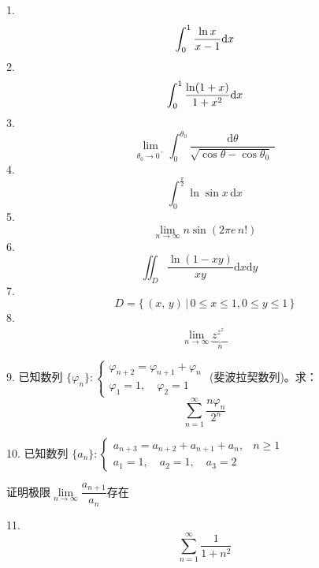 \documentclass{article}
\begin{document}
1.
$$\int_0^1 \frac{\ln x}{x-1} {\rm d}x$$
2.
$$\int_0^1 \frac{\ln (1+x)}{1+x^2} {\rm d}x$$
3.
$$\lim_{\theta_0 \rightarrow 0^{\,^+}} \int_{0}^{\theta_0} \frac{\mathrm{d}\theta}{\sqrt{\cos{\theta}-\cos{\theta_0}}\;}$$
4.
$$\int_0^{\frac{\pi}{2}} \ln{\sin{x}}\,\mathrm{d}x$$
5.
$$\lim_{n \rightarrow \infty}  n \sin{(2\pi e \, n!)}$$
6.
$$\iint_D \frac{\ln {(1-x y)}}{x y}  \mathrm{d}x\mathrm{d}y \quad$$
7.
$$D = \{\,(x, \, y) \, | \, 0 \leqslant x \leqslant 1, 0 \leqslant y \leqslant 1 \, \}$$
8.
$$\lim_{n \to \infty} \underbrace{z^{z^{z^{.^{ .^{.^z} }}}}}_n$$

9.
已知数列 
$\{\varphi_n\}:
\begin{cases}
\varphi_{n+2} = \varphi_{n+1} + \varphi_n\\
\varphi_1=1, \quad \varphi_2=1
\end{cases}$ (斐波拉契数列)。求：
$$\sum_{n=1}^{\infty} \frac{n \varphi_n}{2^n}$$

10.
已知数列 
$\{a_n\}:
\begin{cases}
a_{n+3} = a_{n+2} + a_{n+1}  + a_{n}, &n \geqslant 1 \\
a_1=1, \quad a_2 = 1, \quad a_3  = 2
\end{cases}$ \par
证明极限$\lim\limits_{n \to \infty} \dfrac{a_{n+1}}{a_n}$存在

11.
$$\sum_{n=1}^\infty {\frac{1}{1+n^2}}$$
\end{document}
